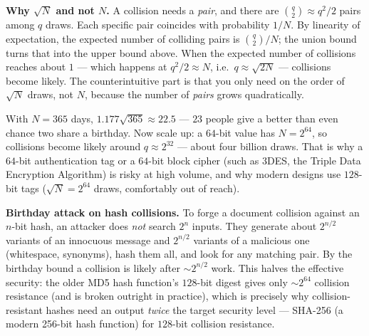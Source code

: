 \begin{whybox}
\textbf{Why $\sqrt{N}$ and not $N$.} A collision needs a \emph{pair}, and there are
$\binom{q}{2}\approx q^2/2$ pairs among $q$ draws. Each specific pair coincides with
probability $1/N$. By linearity of expectation, the expected number of colliding
pairs is $\binom{q}{2}/N$; the union bound turns that into the upper bound above.
When the expected number of collisions reaches about $1$ --- which happens at
$q^2/2 \approx N$, i.e.\ $q\approx\sqrt{2N}$ --- collisions become likely. The
counterintuitive part is that you only need on the order of $\sqrt N$ draws, not
$N$, because the number of \emph{pairs} grows quadratically.
\end{whybox}

\begin{example}
\label{ch41:ex-birthday}
With $N=365$ days, $1.177\sqrt{365}\approx 22.5$ --- $23$ people give a better
than even chance two share a birthday. Now scale up: a $64$-bit value has
$N=2^{64}$, so collisions become likely around $q\approx 2^{32}$ --- about four
billion draws. That is why a $64$-bit authentication tag or a $64$-bit block cipher
(such as 3DES, the Triple Data Encryption Algorithm) is risky at high volume, and why modern designs use $128$-bit tags
($\sqrt{N}=2^{64}$ draws, comfortably out of reach).
\end{example}

\begin{attackbox}
\textbf{Birthday attack on hash collisions.} To forge a document collision against
an $n$-bit hash, an attacker does \emph{not} search $2^n$ inputs. They generate
about $2^{n/2}$ variants of an innocuous message and $2^{n/2}$ variants of a
malicious one (whitespace, synonyms), hash them all, and look for any matching
pair. By the birthday bound a collision is likely after $\sim 2^{n/2}$ work.
This halves the effective security: the older MD5 hash function's $128$-bit digest gives only $\sim 2^{64}$
collision resistance (and is broken outright in practice), which is precisely why
collision-resistant hashes need an output \emph{twice} the target security level
--- SHA-256 (a modern 256-bit hash function) for $128$-bit collision resistance.
\end{attackbox}


